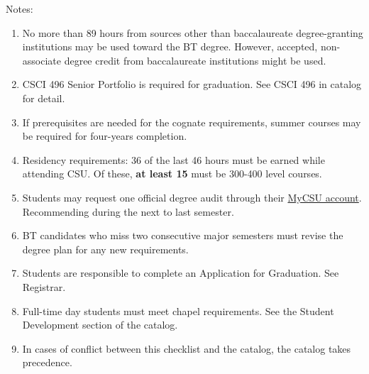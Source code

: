 Notes:%
\begin{enumerate}\footnotesize
	\item No more than 89 hours from sources other than baccalaureate degree-granting institutions may be used toward the BT degree. However, accepted, non-associate degree credit from baccalaureate institutions might be used.
	\item CSCI 496 Senior Portfolio is required for graduation. See CSCI 496 in catalog for detail.
	\item If prerequisites are needed for the cognate requirements, summer courses may be required for four-years completion.
	\item Residency requirements: 36 of the last 46 hours must be earned while attending CSU. Of these, \textbf{at least 15} must be 300-400 level courses.
	\item Students may request one official degree audit through their \href{https://portal.csuniv.edu/}{MyCSU account}. Recommending during the next to last semester.
	\item BT candidates who miss two consecutive major semesters must revise the degree plan for any new requirements.
	\item Students are responsible to complete an Application for Graduation. See Registrar.
	\item Full-time day students must meet chapel requirements. See the Student Development section of the catalog.
	\item In cases of conflict between this checklist and the catalog, the catalog takes precedence.
\end{enumerate}